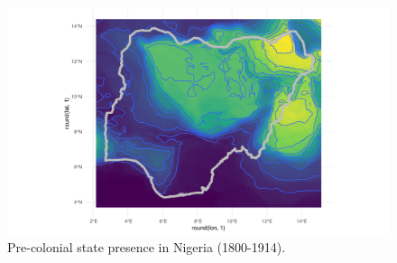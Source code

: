 \documentclass[12pt]{article}
\begin{document}
\begin{figure}[htpb]
	\centering
	\includegraphics[width=\textwidth,keepaspectratio]{../R/Output/nigeria.pdf}
	\caption{Pre-colonial state presence in Nigeria (1800-1914).}
	\label{nigeria}
\end{figure}


\end{document}
